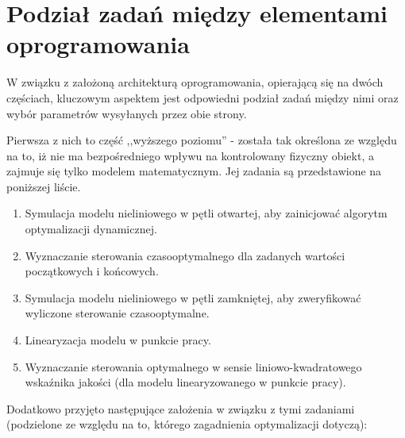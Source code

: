 \section{Podział zadań między elementami oprogramowania}
\label{sec:podzial-zadan}

W związku z założoną architekturą oprogramowania, opierającą się na dwóch częściach, kluczowym aspektem jest odpowiedni podział zadań między nimi oraz wybór parametrów wysyłanych przez obie strony.

Pierwsza z nich to część ,,wyższego poziomu'' - została tak określona ze względu na to, iż nie ma bezpośredniego wpływu na kontrolowany fizyczny obiekt, a zajmuje się tylko modelem matematycznym. Jej zadania są przedstawione na poniższej liście.

\begin{enumerate}
    \item Symulacja modelu nieliniowego w pętli otwartej, aby zainicjować algorytm optymalizacji dynamicznej.
    \item Wyznaczanie sterowania czasooptymalnego dla zadanych wartości początkowych i końcowych.
    \item Symulacja modelu nieliniowego w pętli zamkniętej, aby zweryfikować wyliczone sterowanie czasooptymalne.
    \item Linearyzacja modelu w punkcie pracy.
    \item Wyznaczanie sterowania optymalnego w sensie liniowo-kwadratowego wskaźnika jakości (dla modelu linearyzowanego w punkcie pracy).
\end{enumerate}

Dodatkowo przyjęto następujące założenia w związku z tymi zadaniami (podzielone ze względu na to, którego zagadnienia optymalizacji dotyczą):

